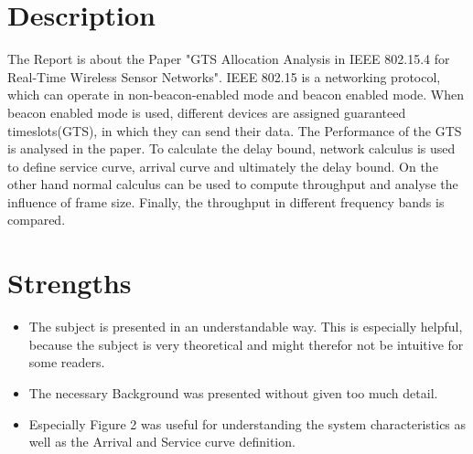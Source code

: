 \documentclass[12pt,british,a4paper]{article}
\begin{document}
\maketitle
\section{Description}
The Report is about the Paper "GTS Allocation Analysis in
IEEE 802.15.4 for Real-Time Wireless Sensor
Networks".
IEEE 802.15 is a networking protocol, which can operate in non-beacon-enabled mode and beacon enabled mode.
When beacon enabled mode is used, different devices are assigned guaranteed timeslots(GTS), in which they can send their data.
The Performance of the GTS is analysed in the paper.
To calculate the delay bound, network calculus is used to define service curve, arrival curve and ultimately the delay bound.
On the other hand normal calculus can be used to compute throughput and analyse the influence of frame size.
Finally, the throughput in different frequency bands is compared.
\section{Strengths}
\begin{itemize}
    \item The subject is presented in an understandable way.
    This is especially helpful, because the subject is very theoretical and might therefor not be intuitive for some readers.
    \item The necessary Background was presented without given too much detail.
    \item Especially Figure 2 was useful for understanding the system characteristics as well as the Arrival and Service curve definition.
\end{itemize}
\pagebreak
\end{document}
